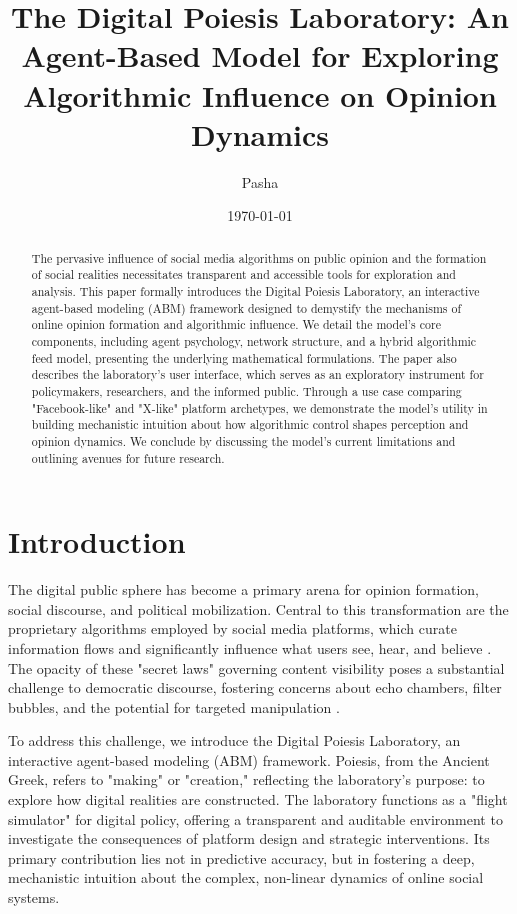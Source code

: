 \documentclass[10pt,a4paper]{article}
\title{The Digital Poiesis Laboratory: An Agent-Based Model for Exploring Algorithmic Influence on Opinion Dynamics}
\author[\thanks{Corresponding Author: Pasha Abdollahi}]{Pasha}
\affil[ ]{Digital Poiesis Lab}
\date{\today}
\begin{document}
\maketitle

\begin{abstract}
The pervasive influence of social media algorithms on public opinion and the formation of social realities necessitates transparent and accessible tools for exploration and analysis. This paper formally introduces the Digital Poiesis Laboratory, an interactive agent-based modeling (ABM) framework designed to demystify the mechanisms of online opinion formation and algorithmic influence. We detail the model's core components, including agent psychology, network structure, and a hybrid algorithmic feed model, presenting the underlying mathematical formulations. The paper also describes the laboratory's user interface, which serves as an exploratory instrument for policymakers, researchers, and the informed public. Through a use case comparing "Facebook-like" and "X-like" platform archetypes, we demonstrate the model's utility in building mechanistic intuition about how algorithmic control shapes perception and opinion dynamics. We conclude by discussing the model's current limitations and outlining avenues for future research.
\end{abstract}

\section{Introduction}
The digital public sphere has become a primary arena for opinion formation, social discourse, and political mobilization. Central to this transformation are the proprietary algorithms employed by social media platforms, which curate information flows and significantly influence what users see, hear, and believe \citep{algorithmic_amplification}. The opacity of these "secret laws" governing content visibility poses a substantial challenge to democratic discourse, fostering concerns about echo chambers, filter bubbles, and the potential for targeted manipulation \citep{pariser2011filter}.

To address this challenge, we introduce the Digital Poiesis Laboratory, an interactive agent-based modeling (ABM) framework. Poiesis, from the Ancient Greek, refers to "making" or "creation," reflecting the laboratory's purpose: to explore how digital realities are constructed. The laboratory functions as a "flight simulator" for digital policy, offering a transparent and auditable environment to investigate the consequences of platform design and strategic interventions. Its primary contribution lies not in predictive accuracy, but in fostering a deep, mechanistic intuition about the complex, non-linear dynamics of online social systems.
\end{document}
